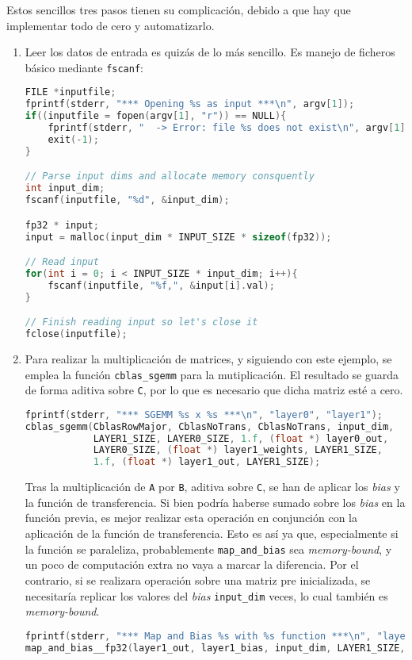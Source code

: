 Estos sencillos tres pasos tienen su complicación, debido a que hay que implementar todo de cero y automatizarlo.

\begin{enumerate}
    \item Leer los datos de entrada es quizás de lo más sencillo. Es manejo de ficheros básico mediante \texttt{fscanf}:\medskip
\begin{lstlisting}[language=C]
FILE *inputfile;
fprintf(stderr, "*** Opening %s as input ***\n", argv[1]);
if((inputfile = fopen(argv[1], "r")) == NULL){
    fprintf(stderr, "  -> Error: file %s does not exist\n", argv[1]);
    exit(-1);
}

// Parse input dims and allocate memory consquently
int input_dim;
fscanf(inputfile, "%d", &input_dim);

fp32 * input;
input = malloc(input_dim * INPUT_SIZE * sizeof(fp32));

// Read input
for(int i = 0; i < INPUT_SIZE * input_dim; i++){
    fscanf(inputfile, "%f,", &input[i].val);
}

// Finish reading input so let's close it
fclose(inputfile);
\end{lstlisting}

    \item Para realizar la multiplicación de matrices, y siguiendo con este ejemplo, se emplea la función \texttt{cblas\_sgemm} para la mutiplicación. El resultado se guarda de forma aditiva sobre \texttt{C}, por lo que es necesario que dicha matriz esté a cero.\medskip
\begin{lstlisting}[language=C]
fprintf(stderr, "*** SGEMM %s x %s ***\n", "layer0", "layer1");
cblas_sgemm(CblasRowMajor, CblasNoTrans, CblasNoTrans, input_dim,
            LAYER1_SIZE, LAYER0_SIZE, 1.f, (float *) layer0_out,
            LAYER0_SIZE, (float *) layer1_weights, LAYER1_SIZE,
            1.f, (float *) layer1_out, LAYER1_SIZE);
\end{lstlisting}

    Tras la multiplicación de \texttt{A} por \texttt{B}, aditiva sobre \texttt{C}, se han de aplicar los \textit{bias} y la función de transferencia. Si bien podría haberse sumado sobre los \textit{bias} en la función previa, es mejor realizar esta operación en conjunción con la aplicación de la función de transferencia. Esto es así ya que, especialmente si la función se paraleliza, probablemente \texttt{map\_and\_bias} sea \textit{memory-bound}, y un poco de computación extra no vaya a marcar la diferencia. Por el contrario, si se realizara operación sobre una matriz pre inicializada, se necesitaría replicar los valores del \textit{bias} \texttt{input\_dim} veces, lo cual también es \textit{memory-bound}.
\begin{lstlisting}[language=C]
fprintf(stderr, "*** Map and Bias %s with %s function ***\n", "layer1_out", "sigmoid__fp32");
map_and_bias__fp32(layer1_out, layer1_bias, input_dim, LAYER1_SIZE, 'N', sigmoid__fp32);
\end{lstlisting}


\end{enumerate}
